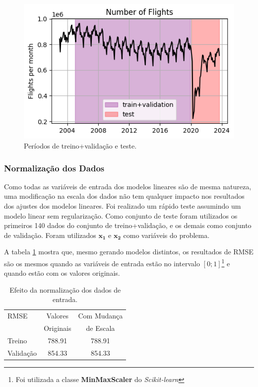 \documentclass[final,5p]{elsarticle}
\numberwithin{equation}{section}
\begin{document}
    \begin{figure}[hbt!]
        \includegraphics[width=0.95\columnwidth]{B1_TrainTest.png}
        \caption{Períodos de treino+validação e teste.}
        \label{fig:treino_teste}
    \end{figure}

    \subsubsection{Normalização dos Dados}

    Como todas as variáveis de entrada dos modelos lineares são de mesma natureza, uma modificação na escala dos dados não tem qualquer impacto nos resultados dos ajustes dos modelos lineares. Foi realizado um rápido teste assumindo um modelo linear sem regularização. Como conjunto de teste foram utilizados os primeiros 140 dados do conjunto de treino+validação, e os demais como conjunto de validação. Foram utilizados $\textbf{x}_{\textbf{1}}$ e $\textbf{x}_{\textbf{2}}$ como variáveis do problema.

    A tabela \ref{tab:efeito_mimmaxscaler} mostra que, mesmo gerando modelos distintos, os resultados de RMSE são os mesmos quando as variáveis de entrada estão no intervalo $[0;1]$\footnote{Foi utilizada a classe \textbf{MinMaxScaler} do \emph{Scikit-learn}} e quando estão com os valores originais.

    \begin{table}[h]
        \centering
        \begin{tabular}{l c c}
        \hline
        RMSE & Valores & Com Mudança \\
         & Originais & de Escala \\
        \hline
        Treino & 788.91 & 788.91 \\
        Validação & 854.33 & 854.33 \\
        \hline
        \end{tabular}
        \caption{Efeito da normalização dos dados de entrada.}
        \label{tab:efeito_mimmaxscaler}
    \end{table}
\end{document}
